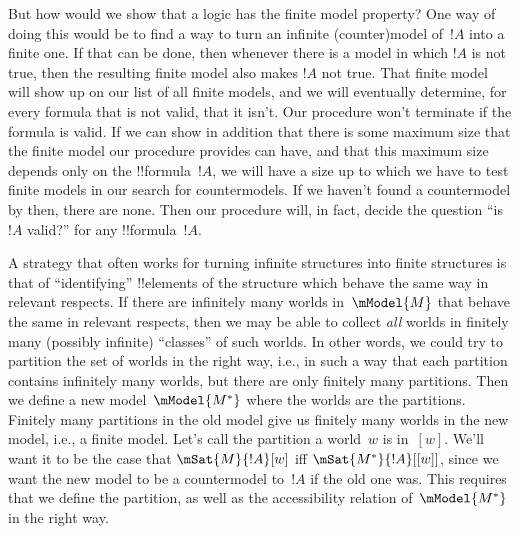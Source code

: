 \documentclass[../../../include/open-logic-section]{subfiles}
\begin{document}
But how would we show that a logic has the finite model property? One
way of doing this would be to find a way to turn an infinite
(counter)model of~$!A$ into a finite one. If that can be done, then
whenever there is a model in which $!A$ is not true, then the
resulting finite model also makes $!A$ not true. That finite model
will show up on our list of all finite models, and we will eventually
determine, for every formula that is not valid, that it isn't. Our
procedure won't terminate if the formula is valid. If we can show in
addition that there is some maximum size that the finite model our
procedure provides can have, and that this maximum size depends only
on the !!{formula}~$!A$, we will have a size up to which we have to
test finite models in our search for countermodels. If we haven't
found a countermodel by then, there are none. Then our procedure will,
in fact, decide the question ``is $!A$ valid?'' for any
!!{formula}~$!A$.

A strategy that often works for turning infinite structures into
finite structures is that of ``identifying'' !!{element}s of the
structure which behave the same way in relevant respects. If there are
infinitely many worlds in~$\mModel{M}$ that behave the same in
relevant respects, then we may be able to collect \emph{all} worlds in
finitely many (possibly infinite) ``classes'' of such worlds. In other
words, we could try to partition the set of worlds in the right way, i.e.,
in such a way that each partition contains infinitely many worlds, but
there are only finitely many partitions. Then we define a new
model~$\mModel{M^*}$ where the worlds are the partitions. Finitely
many partitions in the old model give us finitely many worlds in the
new model, i.e., a finite model. Let's call the partition a world~$w$
is in~$[w]$. We'll want it to be the case that $\mSat{M}{!A}[w]$ iff
$\mSat{M^*}{!A}[{[w]}]$, since we want the new model to be a
countermodel to~$!A$ if the old one was. This requires that we define
the partition, as well as the accessibility relation of~$\mModel{M^*}$
in the right way.
\end{document}
